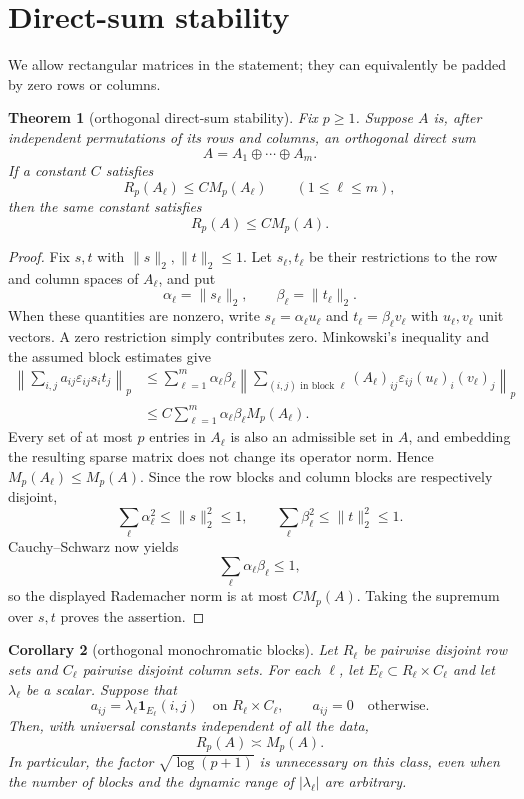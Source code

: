 \documentclass[11pt]{article}
\newtheorem{theorem}{Theorem}
\newtheorem{corollary}[theorem]{Corollary}
\newcommand{\Rp}{R_p}
\newcommand{\Mp}{M_p}
\begin{document}
\section{Direct-sum stability}

We allow rectangular matrices in the statement; they can equivalently be
padded by zero rows or columns.

\begin{theorem}[orthogonal direct-sum stability]\label{thm:stability}
Fix $p\geq1$.  Suppose $A$ is, after independent permutations of its rows and
columns, an orthogonal direct sum
\[
 A=A_1\oplus\cdots\oplus A_m.
\]
If a constant $C$ satisfies
\[
 \Rp(A_\ell)\leq C\Mp(A_\ell)
 \qquad(1\leq\ell\leq m),
\]
then the same constant satisfies
\[
 \Rp(A)\leq C\Mp(A).
\]
\end{theorem}

\begin{proof}
Fix $s,t$ with $\|s\|_2,\|t\|_2\leq1$.  Let $s_\ell,t_\ell$ be their
restrictions to the row and column spaces of $A_\ell$, and put
\[
 \alpha_\ell=\|s_\ell\|_2,\qquad
 \beta_\ell=\|t_\ell\|_2.
\]
When these quantities are nonzero, write
$s_\ell=\alpha_\ell u_\ell$ and
$t_\ell=\beta_\ell v_\ell$ with $u_\ell,v_\ell$ unit vectors.  A zero
restriction simply contributes zero.  Minkowski's inequality and the assumed
block estimates give
\begin{align*}
 \left\|\sum_{i,j}a_{ij}\varepsilon_{ij}s_it_j\right\|_p
 &\leq \sum_{\ell=1}^m
 \alpha_\ell\beta_\ell
 \left\|\sum_{(i,j)\text{ in block }\ell}
 (A_\ell)_{ij}\varepsilon_{ij}(u_\ell)_i(v_\ell)_j\right\|_p\\
 &\leq C\sum_{\ell=1}^m
 \alpha_\ell\beta_\ell\Mp(A_\ell).
\end{align*}
Every set of at most $p$ entries in $A_\ell$ is also an admissible set in
$A$, and embedding the resulting sparse matrix does not change its operator
norm.  Hence $\Mp(A_\ell)\leq\Mp(A)$.  Since the row blocks and column blocks
are respectively disjoint,
\[
 \sum_\ell\alpha_\ell^2\leq\|s\|_2^2\leq1,
 \qquad
 \sum_\ell\beta_\ell^2\leq\|t\|_2^2\leq1.
\]
Cauchy--Schwarz now yields
\[
 \sum_\ell\alpha_\ell\beta_\ell\leq1,
\]
so the displayed Rademacher norm is at most $C\Mp(A)$.  Taking the supremum
over $s,t$ proves the assertion.
\end{proof}

\begin{corollary}[orthogonal monochromatic blocks]\label{cor:blocks}
Let $R_\ell$ be pairwise disjoint row sets and $C_\ell$ pairwise disjoint
column sets.  For each $\ell$, let
$E_\ell\subset R_\ell\times C_\ell$ and let $\lambda_\ell$ be a scalar.
Suppose that
\[
 a_{ij}=\lambda_\ell\mathbf1_{E_\ell}(i,j)
 \quad\text{on }R_\ell\times C_\ell,
 \qquad a_{ij}=0\quad\text{otherwise}.
\]
Then, with universal constants independent of all the data,
\[
 \Rp(A)\asymp\Mp(A).
\]
In particular, the factor $\sqrt{\log(p+1)}$ is unnecessary on this class,
even when the number of blocks and the dynamic range of
$|\lambda_\ell|$ are arbitrary.
\end{corollary}
\end{document}
